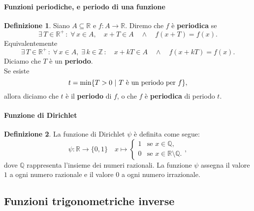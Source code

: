 \documentclass{article}
\theoremstyle{plain}
\theoremstyle{definition}
\newtheorem{defn}{Definizione}[section]
\theoremstyle{remark}
\begin{document}
\paragraph{Funzioni periodiche, e periodo di una funzione}
\begin{bxthm}
\begin{defn}
    Siano $A\subseteq\mathbb{R}$ e $f: A \to \mathbb{R}$. Diremo che $f$ è \textbf{periodica} se \[\exists\,T\in\mathbb{R}^+\,:\;\forall\,x\in A,\quad x + T \in A\quad\land\quad f(x + T) = f(x).\]
    Equivalentemente
    \[\exists\,T\in\mathbb{R}^+\,:\;\forall\,x\in A,\;\exists\,k \in \mathbb{Z}\,:\quad x + kT \in A\quad\land\quad f(x + kT) = f(x).\]
    Diciamo che $T$ è un \textbf{periodo}.\\
    Se esiste \[t = \min\{T > 0 \ | \ T \textup{ è un periodo per } f \},\] allora diciamo che $t$ è il 
    \textbf{periodo} di $f$, o che $f$ è \textbf{periodica} di periodo $t$.
\end{defn}
\end{bxthm}

\vspace{10pt}

\paragraph{Funzione di Dirichlet}
\begin{bxthm}
\begin{defn}
    La funzione di Dirichlet $\psi$ è definita come segue:
    \[\psi: \mathbb{R}\to \{0,1\}\quad
        x\mapsto \begin{cases} 
            1 & \text{se } x \in \mathbb{Q}, \\
            0 & \text{se } x \in\mathbb{R}\setminus\mathbb{Q}.
        \end{cases},\]
    dove $\mathbb{Q}$ rappresenta l'insieme dei numeri razionali. 
    La funzione $\psi$ assegna il valore $1$ a ogni numero razionale e il valore $0$ a ogni numero irrazionale.
\end{defn}
\end{bxthm}

\vspace{10pt}

\subsection{Funzioni trigonometriche inverse}

\vspace{10pt}
\end{document}
